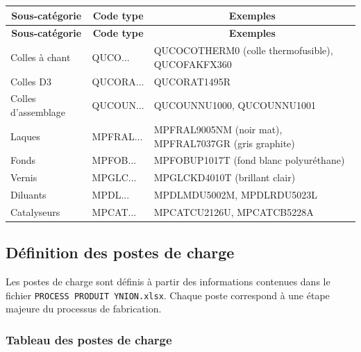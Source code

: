\documentclass[12pt,a4paper]{article}
\begin{document}
\begin{longtable}{|p{3cm}|p{4cm}|p{9cm}|}
\hline
\multicolumn{1}{|c|}{\textbf{Sous-catégorie}} & \multicolumn{1}{c|}{\textbf{Code type}} & \multicolumn{1}{c|}{\textbf{Exemples}} \\
\hline
\endfirsthead
\hline
\multicolumn{1}{|c|}{\textbf{Sous-catégorie}} & \multicolumn{1}{c|}{\textbf{Code type}} & \multicolumn{1}{c|}{\textbf{Exemples}} \\
\hline
\endhead
\hline
\endfoot
Colles à chant & QUCO... & QUCOCOTHERM0 (colle thermofusible), QUCOFAKFX360 \\
Colles D3 & QUCORA... & QUCORAT1495R \\
Colles d'assemblage & QUCOUN... & QUCOUNNU1000, QUCOUNNU1001 \\
Laques & MPFRAL... & MPFRAL9005NM (noir mat), MPFRAL7037GR (gris graphite) \\
Fonds & MPFOB... & MPFOBUP1017T (fond blanc polyuréthane) \\
Vernis & MPGLC... & MPGLCKD4010T (brillant clair) \\
Diluants & MPDL... & MPDLMDU5002M, MPDLRDU5023L \\
Catalyseurs & MPCAT... & MPCATCU2126U, MPCATCB5228A \\
\hline
\end{longtable}

\subsection{Définition des postes de charge}

Les postes de charge sont définis à partir des informations contenues dans le fichier \texttt{PROCESS PRODUIT YNION.xlsx}. Chaque poste correspond à une étape majeure du processus de fabrication.

\subsubsection{Tableau des postes de charge}
\end{document}
